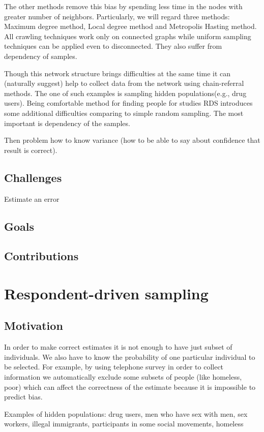 \documentclass[12pt]{report}
\begin{document}
The other methods remove this bias by spending less time in the nodes with greater number of neighbors. Particularly, we will regard three methods: Maximum degree 
method, Local degree method and Metropolis Hasting method. All crawling techniques work only on connected graphs while uniform sampling techniques can be applied even to disconnected. They also suffer from dependency of samples.

Though this network structure brings difficulties at the same time it can (naturally suggest) help to collect data from the network using chain-referral methods.
The one of such examples is sampling hidden populations(e.g., drug users).
Being comfortable method for finding people for studies RDS introduces some additional difficulties comparing to simple random sampling. The most important is dependency of the samples.

Then problem how to know variance (how to be able to say about confidence that result is correct).


\section{Challenges}

Estimate an error

\section{Goals}
\section{Contributions}


\chapter{Respondent-driven sampling}
\section{Motivation}

In order to make correct estimates it is not enough to have just subset of individuals. We also have to know the probability of one particular individual to be selected. For example, by using telephone survey in order to collect information we automatically exclude some subsets of people (like homeless, poor) which can affect the correctness of the estimate because it is impossible to predict bias. 

Examples of hidden populations: drug users, men who have sex with men, sex workers, illegal immigrants, participants in some social movements, homeless \cite{salganik2004sampling}
\end{document}
